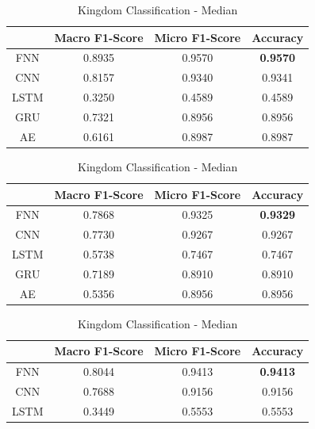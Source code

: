 \documentclass[conference]{IEEEtran}
\begin{document}
\begin{table}[htbp]

\begin{center}
\caption{Kingdom Classification - Dropped}

\begin{tabular}{|c|c|c|c|}
\hline
& Macro F1-Score& Micro F1-Score& Accuracy \\
\hline
FNN& 0.8935& 0.9570& \textbf{0.9570}\\

CNN& 0.8157& 0.9340& 0.9341\\

LSTM& 0.3250& 0.4589& 0.4589\\

GRU& 0.7321& 0.8956& 0.8956\\

AE& 0.6161& 0.8987& 0.8987\\
\hline
\end{tabular}
\end{center}

\begin{center}
\caption{Kingdom Classification - Mean}
\begin{tabular}{|c|c|c|c|}
\hline
& Macro F1-Score& Micro F1-Score& Accuracy \\
\hline
FNN& 0.7868& 0.9325& \textbf{0.9329}\\

CNN& 0.7730& 0.9267& 0.9267\\

LSTM& 0.5738& 0.7467& 0.7467\\

GRU& 0.7189& 0.8910& 0.8910\\

AE& 0.5356& 0.8956& 0.8956\\
\hline
\end{tabular}
\end{center}


\begin{center}
\caption{Kingdom Classification - Median}
\begin{tabular}{|c|c|c|c|}
\hline
& Macro F1-Score& Micro F1-Score& Accuracy \\
\hline
FNN& 0.8044& 0.9413& \textbf{0.9413}\\

CNN& 0.7688& 0.9156& 0.9156\\

LSTM& 0.3449& 0.5553& 0.5553\\


\end{tabular}
\end{center}
\end{table}
\end{document}
